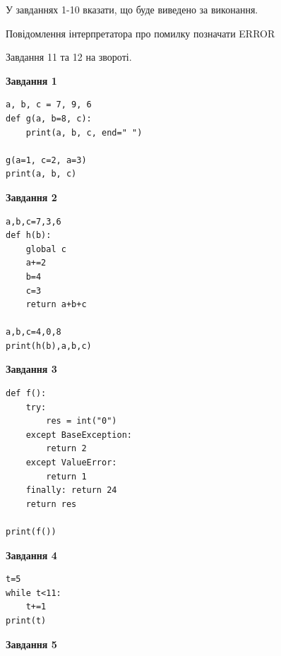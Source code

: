 \documentclass[12pt, ukrainian]{article}
\begin{document}
{{{{{{{{{{{{{У завданнях 1-10 вказати, що буде виведено за виконання.

Повідомлення інтерпретатора про помилку позначати ERROR

Завдання 11 та 12 на звороті.

\begin{minipage}[t]{7.5cm}

\begin{center}
\textbf{Завдання 1}
\end{center}

\begin{verbatim}
a, b, c = 7, 9, 6
def g(a, b=8, c):
    print(a, b, c, end=" ")

g(a=1, c=2, a=3)
print(a, b, c)
\end{verbatim}



\begin{center}
\textbf{Завдання 2}
\end{center}

\begin{verbatim}
a,b,c=7,3,6
def h(b):
    global c
    a+=2
    b=4
    c=3
    return a+b+c

a,b,c=4,0,8
print(h(b),a,b,c)
\end{verbatim}



\begin{center}
\textbf{Завдання 3}
\end{center}

\begin{verbatim}
def f():
    try:
        res = int("0")
    except BaseException: 
        return 2
    except ValueError: 
        return 1
    finally: return 24
    return res

print(f())
\end{verbatim}



\begin{center}
\textbf{Завдання 4}
\end{center}

\begin{verbatim}
t=5
while t<11:
    t+=1
print(t)
\end{verbatim}

\end{minipage}
\vline \hspace{6mm}
\begin{minipage}[t]{10.5cm}

\begin{center}
\textbf{Завдання 5}
\end{center}


\end{minipage}}}}}}}}}}}}}}
\end{document}
